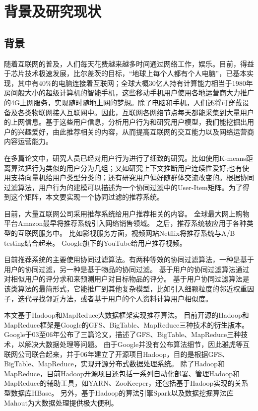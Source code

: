 \chapter{背景及研究现状}

\section{背景}
随着互联网的普及，人们每天花费越来越多时间通过网络工作，娱乐。目前，得益于芯片技术极速发展，比尔盖茨的目标，“地球上每个人都有个人电脑”，已基本实现，其中有40\%的电脑连接着互联网；全球大概30亿人持有计算能力相当于1980年房间般大小的超级计算机的智能手机，这些移动手机用户使用各地运营商大力推广的4G上网服务，实现随时随地上网的梦想。除了电脑和手机，人们还将可穿戴设备及各类物联网接入互联网中。因此，互联网各网络节点每天都能采集到大量用户的上网信息。基于这些用户信息，分析用户行为和研究用户模型，我们能挖掘出用户的兴趣爱好，由此推荐相关的内容，从而提高互联网的交互能力以及网络运营商内容运营能力。

在多篇论文中，研究人员已经对用户行为进行了细致的研究。比如使用K-means距离算法\parencite{杨清龙2013基于网络日志的互联网用户行为分析}把行为类似的用户分为几组；又如研究上下文推断用户连续性爱好\parencite{史艳翠2013基于通信数据的上下文移动用户偏好动态获取方法研究};也有使用支持向量机给用户类型分类的\parencite{程辉2013网络用户偏好分析及话题趋势预测方法研究}；还有研究用户偏好随群体交流改变的\parencite{张欢2014网络用户偏好分析方法的研究,程辉2013网络用户偏好分析及话题趋势预测方法研究}。根据协同过滤算法\parencite{Resnick}，用户行为的建模可以描述为一个协同过滤中的User-Item矩阵。为了得到这个矩阵，本文要实现一个协同过滤的推荐系统。

目前，大量互联网公司采用推荐系统给用户推荐相关的内容。
全球最大网上购物平台Amazon最早将推荐系统引入网络销售领域\parencite{1167344}。
之后，推荐系统被应用于各种类型的互联网服务中。
比如影视服务方面，视频网站Netflix将推荐系统与A/B testing结合起来\parencite{Kondo2015The}。
Google旗下的YouTube给用户推荐视频\parencite{Davidson2010The}。

目前推荐系统的主要使用协同过滤算法。有两种等效的协同过滤算法，一种是基于用户的协同过滤，另一种是基于物品的协同过滤。
基于用户的协同过滤算法通过对相似用户的评分求和来预测用户对目标物品的评分\parencite{Resnick}。
基于用户协同过滤算法是该类算法的最简形式\parencite{adomavicius2005toward}，它能推广到其他复杂模型，比如引入细颗粒度的邻近权重因子\parencite{herlocker2000explaining}，迭代寻找邻近方法\parencite{Zhang2007A}，或者基于用户的个人资料计算用户相似度\parencite{shi2009exploiting}。

本文基于Hadoop和MapReduce大数据框架实现推荐算法。
目前开源的Hadoop和MapReduce框架是Google的GFS、BigTable、MapReduce三种技术的衍生版本。
Google于03至06年公布了三篇论文，描述了GFS、BigTable、MapReduce三种技术\parencite{Ghemawat2004MapReduce,Ghemawat2003The,Chang2008Bigtable}，以解决大数据处理等问题。
由于Google并没有公布算法细节，因此雅虎等互联网公司联合起来，并于06年建立了开源项目Hadoop，目的是根据GFS、BigTable、MapReduce，实现开源分布式数据处理系统。
除了Hadoop和MapReduce，目前Hadoop开源项目还包括一系列自动化部署、管理Hadoop和MapReduce的辅助工具，如YARN、ZooKeeper，还包括基于Hadoop实现的关系型数据库HBase。
另外，基于Hadoop的算法引擎Spark以及数据挖掘算法库Mahout为大数据处理提供极大便利。

